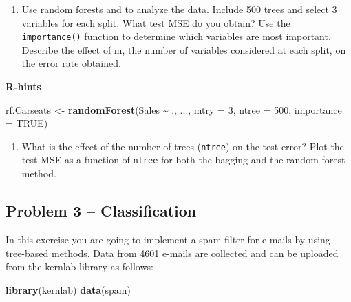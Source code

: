 \documentclass[
]{article}
\newenvironment{Shaded}{\begin{snugshade}}{\end{snugshade}}
\newcommand{\AttributeTok}[1]{\textcolor[rgb]{0.13,0.29,0.53}{#1}}
\newcommand{\ConstantTok}[1]{\textcolor[rgb]{0.56,0.35,0.01}{#1}}
\newcommand{\DecValTok}[1]{\textcolor[rgb]{0.00,0.00,0.81}{#1}}
\newcommand{\FunctionTok}[1]{\textcolor[rgb]{0.13,0.29,0.53}{\textbf{#1}}}
\newcommand{\NormalTok}[1]{#1}
\newcommand{\OtherTok}[1]{\textcolor[rgb]{0.56,0.35,0.01}{#1}}
\newcommand{\SpecialCharTok}[1]{\textcolor[rgb]{0.81,0.36,0.00}{\textbf{#1}}}
\providecommand{\tightlist}{%
  \setlength{\itemsep}{0pt}\setlength{\parskip}{0pt}}
\begin{document}
\begin{enumerate}
\def\labelenumi{\alph{enumi})}
\setcounter{enumi}{4}
\tightlist
\item
  Use random forests and to analyze the data. Include 500 trees and
  select 3 variables for each split. What test MSE do you obtain? Use
  the \texttt{importance()} function to determine which variables are
  most important. Describe the effect of m, the number of variables
  considered at each split, on the error rate obtained.
\end{enumerate}

\textbf{R-hints}

\begin{Shaded}
\begin{Highlighting}[]
\NormalTok{rf.Carseats }\OtherTok{\textless{}{-}} \FunctionTok{randomForest}\NormalTok{(Sales }\SpecialCharTok{\textasciitilde{}}\NormalTok{ .,}
\NormalTok{                            ...,}
                            \AttributeTok{mtry =} \DecValTok{3}\NormalTok{,}
                            \AttributeTok{ntree =} \DecValTok{500}\NormalTok{,}
                            \AttributeTok{importance =} \ConstantTok{TRUE}\NormalTok{)}
\end{Highlighting}
\end{Shaded}

\begin{enumerate}
\def\labelenumi{\alph{enumi})}
\setcounter{enumi}{5}
\tightlist
\item
  What is the effect of the number of trees (\texttt{ntree}) on the test
  error? Plot the test MSE as a function of \texttt{ntree} for both the
  bagging and the random forest method.
\end{enumerate}

\subsection{Problem 3 -- Classification}\label{problem-3-classification}

In this exercise you are going to implement a spam filter for e-mails by
using tree-based methods. Data from 4601 e-mails are collected and can
be uploaded from the kernlab library as follows:

\begin{Shaded}
\begin{Highlighting}[]
\FunctionTok{library}\NormalTok{(kernlab)}
\FunctionTok{data}\NormalTok{(spam)}
\end{Highlighting}
\end{Shaded}
\end{document}
